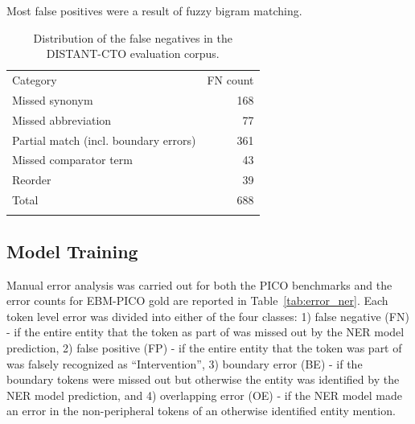 \documentclass[11pt]{article}
\begin{document}
Most false positives were a result of fuzzy bigram matching. 
%
\begin{table}[ht]
    \centering
    \begin{tabular}{l|r}
    \Xhline{1pt}
       Category & FN count  \\
    \Xhline{1pt}
       Missed synonym  & 168 \\
       Missed abbreviation & 77 \\
       Partial match (incl. boundary errors) & 361 \\
       Missed comparator term & 43 \\
       Reorder & 39 \\
       Total & 688 \\
    \Xhline{1pt}
    \end{tabular}
    \caption{Distribution of the false negatives in the DISTANT-CTO evaluation corpus.}
    \label{tab:error_candgen}
\end{table}
%
%
%
\subsection{Model Training}
\label{subsec:error_modeltrain}
%
Manual error analysis was carried out for both the PICO benchmarks and the error counts for EBM-PICO gold are reported in Table~\ref{tab:error_ner}.
Each token level error was divided into either of the four classes: 1) false negative (FN) - if the entire entity that the token as part of was missed out by the NER model prediction, 2) false positive (FP) - if the entire entity that the token was part of was falsely recognized as ``Intervention'', 3) boundary error (BE) - if the boundary tokens were missed out but otherwise the entity was identified by the NER model prediction, and 4) overlapping error (OE) - if the NER model made an error in the non-peripheral tokens of an otherwise identified entity mention.
\end{document}
